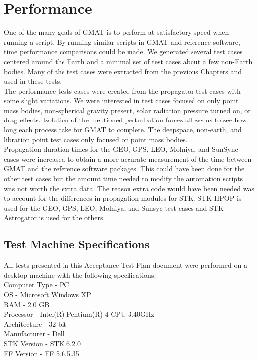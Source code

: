 \chapter{Performance}
\label{Ch:Performance}

One of the many goals of GMAT is to perform at satisfactory speed
when running a script. By running similar scripts in GMAT and
reference software, time performance comparisons could be made. We
generated several test cases centered around the Earth and a minimal
set of test cases about a few non-Earth bodies. Many of the test
cases were extracted from the previous Chapters and used in these
tests.\\

The performance tests cases were created from the propagator test
cases with some slight variations. We were interested in test cases
focused on only point mass bodies, non-spherical gravity present,
solar radiation pressure turned on, or drag effects. Isolation of
the mentioned perturbation forces allows us to see how long each
process take for GMAT to complete. The deepspace, non-earth, and
libration point test cases only focused on point mass bodies.\\

Propagation duration times for the GEO, GPS, LEO, Molniya, and
SunSync cases were increased to obtain a more accurate measurement
of the time between GMAT and the reference software packages. This
could have been done for the other test cases but the amount time
needed to modify the automation scripts was not worth the extra
data. The reason extra code would have been needed was to account
for the differences in propagation modules for STK. STK-HPOP is used
for the GEO, GPS, LEO, Molniya, and Sunsyc test cases and
STK-Astrogator is used for the others.\\

\section{Test Machine Specifications}
\label{Sec: MachineSpecs}

All tests presented in this Acceptance Test Plan document were
performed on a desktop machine with the following
specifications:\\

Computer Type - PC\\
OS            - Microsoft Windows XP\\
RAM           - 2.0 GB\\
Processor     - Intel(R) Pentium(R) 4 CPU 3.40GHz\\
Architecture  - 32-bit\\
Manufacturer  - Dell\\
STK Version   - STK 6.2.0\\
FF Version    - FF 5.6.5.35\\

